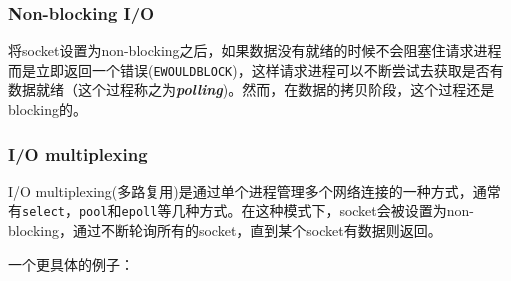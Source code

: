 \documentclass[12pt]{article}
\begin{document}
\subsubsection{Non-blocking I/O}\label{non-blocking-io}

将socket设置为non-blocking之后，如果数据没有就绪的时候不会阻塞住请求进程而是立即返回一个错误(\texttt{EWOULDBLOCK})，这样请求进程可以不断尝试去获取是否有数据就绪（这个过程称之为\textbf{\emph{polling}})。然而，在数据的拷贝阶段，这个过程还是blocking的。

\begin{Shaded}
\begin{Highlighting}[]
 \OperatorTok{\{}
\OperatorTok{=}\OperatorTok{(}\OperatorTok{)}
\OperatorTok{\}} \OperatorTok{(}\OperatorTok{==}\OperatorTok{)}
\end{Highlighting}
\end{Shaded}

\subsubsection{I/O multiplexing}\label{io-multiplexing}

I/O multiplexing(多路复用)是通过单个进程管理多个网络连接的一种方式，通常有\texttt{select}，\texttt{pool}和\texttt{epoll}等几种方式。在这种模式下，socket会被设置为non-blocking，通过不断轮询所有的socket，直到某个socket有数据则返回。

\begin{Shaded}
\begin{Highlighting}[]
\OperatorTok{(}\OperatorTok{)} \OperatorTok{\{}
\OperatorTok{=}\OperatorTok{(}\OperatorTok{)} 
\OperatorTok{=}\OperatorTok{(}\OperatorTok{)}  
\OperatorTok{\}}
\end{Highlighting}
\end{Shaded}

一个更具体的例子：
\end{document}
